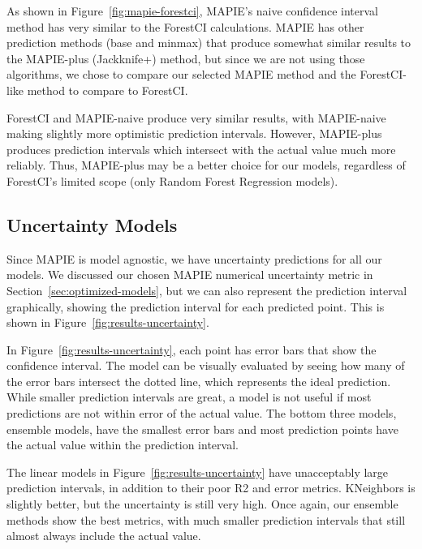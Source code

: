 \documentclass[twocolumn, nofootinbib, secnumarabic, amssymb, nobibnotes, aps, prd]{revtex4-2}
\begin{document}
As shown in Figure~\ref{fig:mapie-forestci}, MAPIE's naive confidence interval method has very similar to the ForestCI calculations. MAPIE has other prediction methods (base and minmax) that produce somewhat similar results to the MAPIE-plus (Jackknife+) method, but since we are not using those algorithms, we chose to compare our selected MAPIE method and the ForestCI-like method to compare to ForestCI.

ForestCI and MAPIE-naive produce very similar results, with MAPIE-naive making slightly more optimistic prediction intervals. However, MAPIE-plus produces prediction intervals which intersect with the actual value much more reliably. Thus, MAPIE-plus may be a better choice for our models, regardless of ForestCI's limited scope (only Random Forest Regression models).

\subsection{Uncertainty Models}
Since MAPIE is model agnostic, we have uncertainty predictions for all our models. We discussed our chosen MAPIE numerical uncertainty metric in Section~\ref{sec:optimized-models}, but we can also represent the prediction interval graphically, showing the prediction interval for each predicted point. This is shown in Figure~\ref{fig:results-uncertainty}.

In Figure~\ref{fig:results-uncertainty}, each point has error bars that show the confidence interval. The model can be visually evaluated by seeing how many of the error bars intersect the dotted line, which represents the ideal prediction. While smaller prediction intervals are great, a model is not useful if most predictions are not within error of the actual value. The bottom three models, ensemble models, have the smallest error bars and most prediction points have the actual value within the prediction interval. 

The linear models in Figure~\ref{fig:results-uncertainty} have unacceptably large prediction intervals, in addition to their poor R2 and error metrics. KNeighbors is slightly better, but the uncertainty is still very high. Once again, our ensemble methods show the best metrics, with much smaller prediction intervals that still almost always include the actual value.
\end{document}
